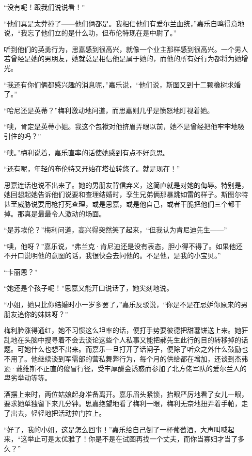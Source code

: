 \par “没有呢！跟我们说说看！”
\par “他们真是太莽撞了——他们俩都是。我相信他们有爱尔兰血统，”嘉乐自鸣得意地说，“我忘了他们立的是什么功，但布伦特现在是中尉了。”
\par 听到他们的英勇行为，思嘉感到很高兴，就像一个业主那样感到很高兴。一个男人若曾经是她的男朋友，她就总是相信他是属于她的，而他的所有好行为都将为她增光。
\par “我还有你们俩都感兴趣的消息呢，”嘉乐说，“他们说，斯图又到十二颗橡树求婚了。”
\par “哈尼还是英蒂？”梅利激动地问道，而思嘉则几乎是愤怒地盯视着她。
\par “噢，肯定是英蒂小姐。我这个包袱对他挤眉弄眼以前，她不是曾经把他牢牢地吸引住的吗？”
\par “噢。”梅利说着，嘉乐直率的话使她感到有点不好意思。
\par “还有呢，年轻的布伦特又开始在塔拉转悠了。就是现在！”
\par 思嘉连话也说不出来了。她的男朋友背信弃义，这简直就是对她的侮辱。特别是，她回想起她告诉他们说要和查理结婚时，孪生兄弟俩那暴跳如雷的样子。斯图尔特甚至威胁说要用枪打死查理，或是思嘉，或是他自己，或者干脆把他们三个都干掉。那真是最最令人激动的场面。
\par “是苏埃伦？”梅利问道，高兴得突然笑了起来，“但我认为肯尼迪先生——”
\par “噢，他呀？”嘉乐说，“弗兰克·肯尼迪还是没有表态，胆小得不得了。如果他还不开口说明他的意图的话，我很快会去问他的。不是他，是我的小宝贝。”
\par “卡丽恩？”
\par “她还是个孩子呢！”思嘉又能开口说话了，她尖刻地说。
\par “小姐，她只比你结婚时小一岁多罢了，”嘉乐反驳说，“你是不是在忌妒你原来的男朋友追你的妹妹呀？”
\par 梅利脸涨得通红，她不习惯这么坦率的话，便打手势要彼德把甜薯饼送上来。她狂乱地在头脑中搜寻着不会去谈论这些个人私事又能把郝先生此行的目的转移掉的话题。可她什么也想不出来。而嘉乐一旦打开了话闸子，便除了听众之外什么鼓励也不用了。他继续谈到军需部的营私舞弊行为，每个月的供给都在增加，还谈到杰弗逊·戴维斯不正直的傻冒行径，受丰厚酬金诱惑而参加了北方佬军队的爱尔兰人的卑劣举动等等。
\par 酒摆上来时，两位姑娘起身准备离开。嘉乐眉头紧锁，抬眼严厉地看了女儿一眼，要求她单独留下来几分钟。思嘉绝望地看了梅利一眼，梅利无奈地扭弄着手帕，走了出去，轻轻地把活动拉门拉上。
\par “好了，我的小姐，这是怎么回事！”嘉乐给自己倒了一杯葡萄酒，大声叫喊起来，“这举止可是太优雅了！你是不是在试图再找一个丈夫，而你当寡妇才当了多久？”

